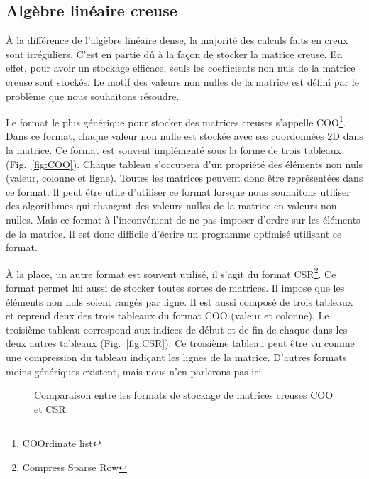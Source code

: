 \subsection{Algèbre linéaire creuse}
\`{A} la différence de l'algèbre linéaire dense, la majorité des calculs faits en creux sont irréguliers.
%
C'est en partie dû à la façon de stocker la matrice creuse.
%
En effet, pour avoir un stockage efficace, seuls les coefficients non nuls de la matrice creuse sont stockés.
%
Le motif des valeurs non nulles de la matrice est défini par le problème que nous souhaitons résoudre.


Le format le plus générique pour stocker des matrices creuses s'appelle COO\footnote{COOrdinate list}.
%
Dans ce format, chaque valeur non nulle est stockée avec ses coordonnées 2D dans la matrice.
%
Ce format est souvent implémenté sous la forme de trois tableaux (Fig.~\ref{fig:COO}).
%
Chaque tableau s'occupera d'un propriété des éléments non nuls (valeur, colonne et ligne).
%
Toutes les matrices peuvent donc être représentées dans ce format.
%
Il peut être utile d'utiliser ce format lorsque nous souhaitons utiliser des algorithmes qui changent des valeurs nulles de la matrice en valeurs non nulles.
%
Mais ce format à l'inconvénient de ne pas imposer d'ordre sur les éléments de la matrice.
%
Il est donc difficile d'écrire un programme optimisé utilisant ce format.


\`A la place, un autre format est souvent utilisé, il s'agit du format CSR\footnote{Compress Sparse Row}.
%
Ce format permet lui aussi de stocker toutes sortes de matrices.
%
Il impose que les éléments non nuls soient rangés par ligne.
%
Il est aussi composé de trois tableaux et reprend deux des trois tableaux du format COO (valeur et colonne).
%
Le troisième tableau correspond aux indices de début et de fin de chaque dans les deux autres tableaux (Fig.~\ref{fig:CSR}).
%
Ce troisième tableau peut être vu comme une compression du tableau indiçant les lignes de la matrice.
%
D'autres formats moins génériques existent, mais nous n'en parlerons pas ici.

\begin{figure}[!h]
     \begin{center}
    \end{center}
    \caption{Comparaison entre les formats de stockage de matrices creuses COO et CSR.}
    \label{fig:matrix_storage}
\end{figure}


